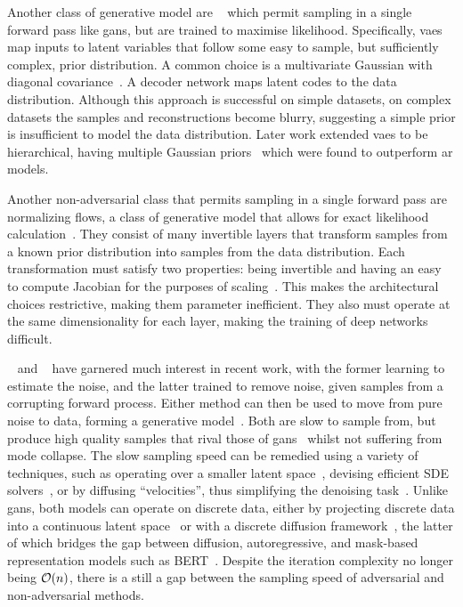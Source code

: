 Another class of generative model are ~\cite{kingma2013vae} which
permit sampling in a single forward pass like \glspl{gan}, but are trained to
maximise likelihood. Specifically, \glspl{vae} map inputs to latent variables
that follow some easy to sample, but sufficiently complex, prior distribution. A
common choice is a multivariate Gaussian with diagonal
covariance~\cite{kingma2013vae}. A decoder network maps latent codes to the data
distribution. Although this approach is successful on simple datasets, on
complex datasets the samples and reconstructions become blurry, suggesting a
simple prior is insufficient to model the data distribution. Later work extended
\glspl{vae} to be hierarchical, having multiple Gaussian
priors~\cite{arash2020nvae,child2020vqvae} which were found to outperform
\gls{ar} models.

Another non-adversarial class that permits sampling in a single forward pass are
normalizing flows, a class of generative model that allows for exact likelihood
calculation~\cite{dinh2014nice,dinh2016density,kingma2018glow}. They consist of
many invertible layers that transform samples from a known prior distribution
into samples from the data distribution. Each transformation must satisfy two
properties: being invertible and having an easy to compute Jacobian for the
purposes of scaling~\cite{dinh2014nice,dinh2016density}. This makes the
architectural choices restrictive, making them parameter inefficient. They also
must operate at the same dimensionality for each layer, making the training of
deep networks difficult.

~\cite{ho2020ddpm,dhariwal2021ddpm} and
~\cite{song2019sbm,song2020sde,song2021mlt,vahdat2021sbmlatent}
have garnered much interest in recent work, with the former learning to estimate
the noise, and the latter trained to remove noise, given samples from a
corrupting forward process. Either method can then be used to move from pure
noise to data, forming a generative model~\cite{song2019sbm}. Both are slow to
sample from, but produce high quality samples that rival those of
\glspl{gan}~\cite{dhariwal2021ddpm} whilst not suffering from mode collapse. The
slow sampling speed can be remedied using a variety of techniques, such as
operating over a smaller latent space~\cite{vahdat2021sbmlatent}, devising
efficient SDE solvers~\cite{martineau2021fast}, or by diffusing ``velocities'',
thus simplifying the denoising task~\cite{dockhorn2021langevin}. Unlike
\glspl{gan}, both models can operate on discrete data, either by projecting
discrete data into a continuous latent space~\cite{vahdat2021sbmlatent} or with
a discrete diffusion framework~\cite{austin2021structured}, the latter of which
bridges the gap between diffusion, autoregressive, and mask-based representation
models such as BERT~\cite{devlin2019bert}. Despite the iteration complexity no
longer being $\mathcal{O}(n)$, there is a still a gap between the sampling speed of
adversarial and non-adversarial methods.

